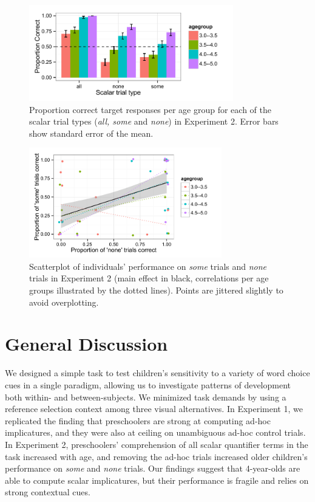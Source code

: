 \documentclass[10pt,letterpaper]{article}
\begin{document}
\begin{figure}[t] 
  \begin{center} 
    \includegraphics[width=3.5in]{figures/implicatures_scalarOnly_clean.pdf} 
    \caption{\label{fig:expt2} Proportion correct target responses per age group for each of the scalar trial types (\emph{all, some} and \emph{none}) in Experiment 2. Error bars show standard error of the mean. }
    \end{center} 
\vspace{-1ex} 
\end{figure}

\begin{figure}[t] 
  \begin{center} 
    \includegraphics[width=3.3in]{figures/implicatures_scalarOnly_scatterplot.pdf} 
    \caption{\label{fig:expt2scatterplot} Scatterplot of individuals' performance on \emph{some} trials and \emph{none} trials in Experiment 2 (main effect in black, correlations per age groups illustrated by the dotted lines). Points are jittered slightly to avoid overplotting. }
    \end{center} 
\vspace{-1ex} 
\end{figure}


 \section{General Discussion} 
 
We designed a simple task to test children's sensitivity to a variety of word choice cues in a single paradigm, allowing us to investigate patterns of development both within- and between-subjects. We minimized task demands by using a reference selection context among three visual alternatives. In Experiment 1, we replicated the finding that preschoolers are strong at computing ad-hoc implicatures, and they were also at ceiling on unambiguous ad-hoc control trials. In Experiment 2, preschoolers' comprehension of all scalar quantifier terms in the task increased with age, and removing the ad-hoc trials increased older children's performance on \emph{some} and \emph{none} trials. Our findings suggest that 4-year-olds are able to compute scalar implicatures, but their performance is fragile and relies on strong contextual cues. 
\end{document}
